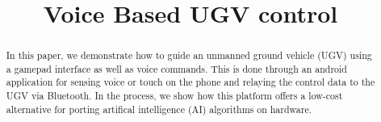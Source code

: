 \documentclass[conference]{IEEEtran}
\begin{document}

\title{Voice Based UGV control}
\author{
}

\maketitle



\bigskip

\begin{abstract}
In this paper, we demonstrate how to guide an unmanned ground vehicle (UGV) using a gamepad interface as well as voice commands. This is done through an android application for sensing voice or touch on the phone and  relaying the control data to the UGV via Bluetooth.  In the process, we show how this platform 
offers a low-cost alternative for porting artifical intelligence (AI) algorithms on hardware.  

\end{abstract}
\end{document}
